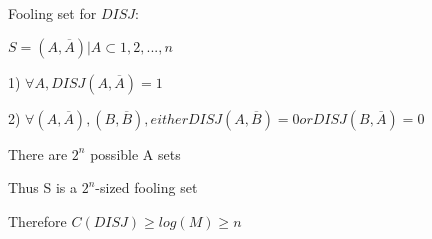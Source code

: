 \documentclass[12pt]{article}
\begin{document}
\par{Fooling set for $DISJ$:}

\par{$S = {(A, \overline{A}) | A \subset {1, 2, ..., n}}$}
\par{\hspace{\parindent} 1) $\forall A, DISJ(A, \overline{A}) = 1$}
\par{\hspace{\parindent} 2) $\forall (A, \overline{A}), (B, \overline{B}), either DISJ(A, \overline{B}) = 0 or DISJ(B, \overline{A}) = 0$}
\\
\par{There are $2^{n}$ possible A sets}
\\
\par{Thus S is a $2^{n}$-sized fooling set}
\\
\par{Therefore $C(DISJ) \geq log(M) \geq n$}
\end{document}
